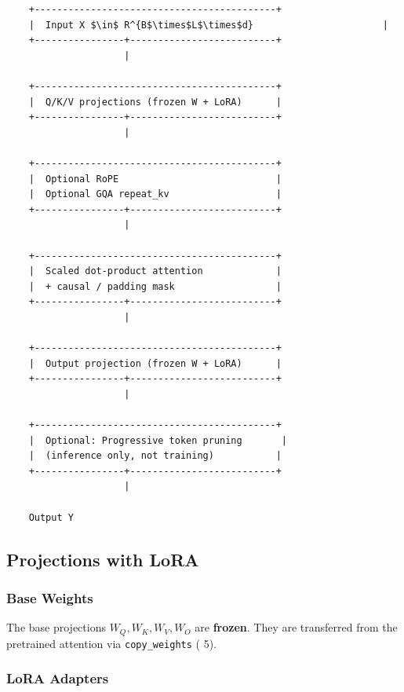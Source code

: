 \begin{lstlisting}
    +-------------------------------------------+
    |  Input X $\in$ R^{B$\times$L$\times$d}                       |
    +----------------+--------------------------+
                     |
                      
    +-------------------------------------------+
    |  Q/K/V projections (frozen W + LoRA)      |
    +----------------+--------------------------+
                     |
                      
    +-------------------------------------------+
    |  Optional RoPE                            |
    |  Optional GQA repeat_kv                   |
    +----------------+--------------------------+
                     |
                      
    +-------------------------------------------+
    |  Scaled dot-product attention             |
    |  + causal / padding mask                  |
    +----------------+--------------------------+
                     |
                      
    +-------------------------------------------+
    |  Output projection (frozen W + LoRA)      |
    +----------------+--------------------------+
                     |
                      
    +-------------------------------------------+
    |  Optional: Progressive token pruning       |
    |  (inference only, not training)           |
    +----------------+--------------------------+
                     |
                      
    Output Y
\end{lstlisting}

\subsection{Projections with LoRA}

\subsubsection{Base Weights}

The base projections $W_Q, W_K, W_V, W_O$ are \textbf{frozen}. They are 
transferred from the pretrained attention via \texttt{copy\_weights} ( 5).

\subsubsection{LoRA Adapters}

